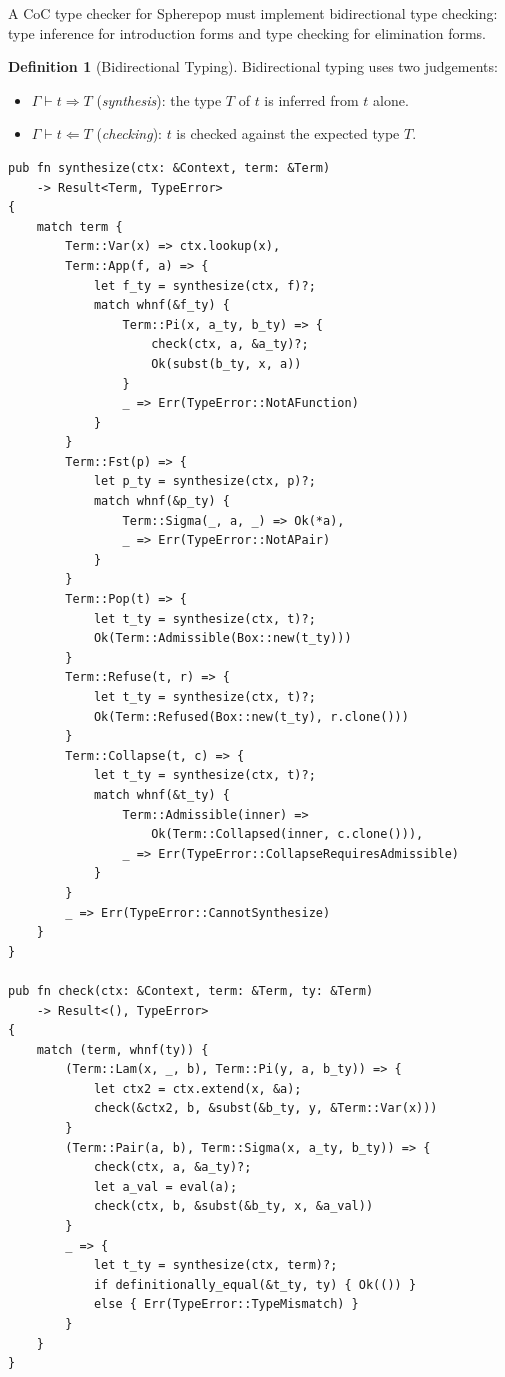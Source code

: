 \documentclass[12pt, a4paper, openany]{book}
\theoremstyle{plain}
\theoremstyle{definition}
\newtheorem{definition}[theorem]{Definition}
\theoremstyle{remark}
\begin{document}
A CoC type checker for Spherepop must implement bidirectional type checking:
type inference for introduction forms and type checking for elimination forms.

\begin{definition}[Bidirectional Typing]
Bidirectional typing uses two judgements:
\begin{itemize}
\item $\Gamma \vdash t \Rightarrow T$ (\emph{synthesis}): the type $T$ of $t$
is inferred from $t$ alone.
\item $\Gamma \vdash t \Leftarrow T$ (\emph{checking}): $t$ is checked against
the expected type $T$.
\end{itemize}
\end{definition}

\begin{lstlisting}[style=rust, caption={Bidirectional type checker core}]
pub fn synthesize(ctx: &Context, term: &Term)
    -> Result<Term, TypeError>
{
    match term {
        Term::Var(x) => ctx.lookup(x),
        Term::App(f, a) => {
            let f_ty = synthesize(ctx, f)?;
            match whnf(&f_ty) {
                Term::Pi(x, a_ty, b_ty) => {
                    check(ctx, a, &a_ty)?;
                    Ok(subst(b_ty, x, a))
                }
                _ => Err(TypeError::NotAFunction)
            }
        }
        Term::Fst(p) => {
            let p_ty = synthesize(ctx, p)?;
            match whnf(&p_ty) {
                Term::Sigma(_, a, _) => Ok(*a),
                _ => Err(TypeError::NotAPair)
            }
        }
        Term::Pop(t) => {
            let t_ty = synthesize(ctx, t)?;
            Ok(Term::Admissible(Box::new(t_ty)))
        }
        Term::Refuse(t, r) => {
            let t_ty = synthesize(ctx, t)?;
            Ok(Term::Refused(Box::new(t_ty), r.clone()))
        }
        Term::Collapse(t, c) => {
            let t_ty = synthesize(ctx, t)?;
            match whnf(&t_ty) {
                Term::Admissible(inner) =>
                    Ok(Term::Collapsed(inner, c.clone())),
                _ => Err(TypeError::CollapseRequiresAdmissible)
            }
        }
        _ => Err(TypeError::CannotSynthesize)
    }
}

pub fn check(ctx: &Context, term: &Term, ty: &Term)
    -> Result<(), TypeError>
{
    match (term, whnf(ty)) {
        (Term::Lam(x, _, b), Term::Pi(y, a, b_ty)) => {
            let ctx2 = ctx.extend(x, &a);
            check(&ctx2, b, &subst(&b_ty, y, &Term::Var(x)))
        }
        (Term::Pair(a, b), Term::Sigma(x, a_ty, b_ty)) => {
            check(ctx, a, &a_ty)?;
            let a_val = eval(a);
            check(ctx, b, &subst(&b_ty, x, &a_val))
        }
        _ => {
            let t_ty = synthesize(ctx, term)?;
            if definitionally_equal(&t_ty, ty) { Ok(()) }
            else { Err(TypeError::TypeMismatch) }
        }
    }
}
\end{lstlisting}
\end{document}
